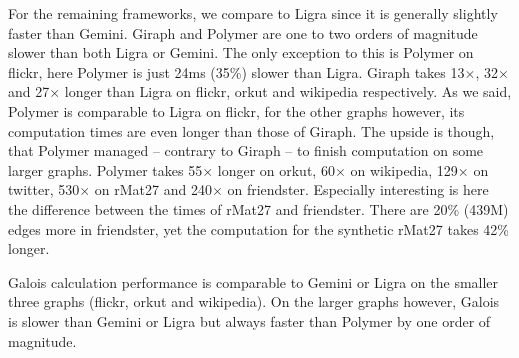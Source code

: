 For the remaining frameworks, we compare to Ligra since it is generally slightly faster than Gemini.
Giraph and Polymer are one to two orders of magnitude slower than both Ligra or Gemini. The only exception to this is Polymer on flickr, here Polymer is just 24ms (35\%) slower than Ligra.
Giraph takes 13$\times$, 32$\times$ and 27$\times$ longer than Ligra on flickr, orkut and wikipedia respectively.
As we said, Polymer is comparable to Ligra on flickr, for the other graphs however, its computation times are even longer than those of Giraph. The upside is though, that Polymer managed -- contrary to Giraph -- to finish computation on some larger graphs.
Polymer takes 55$\times$ longer on orkut, 60$\times$ on wikipedia, 129$\times$ on twitter, 530$\times$ on rMat27 and 240$\times$ on friendster. 
Especially interesting is here the difference between the times of rMat27 and friendster. There are 20\% (439M) edges more in friendster, yet the computation for the synthetic rMat27 takes 42\% longer.

Galois calculation performance is comparable to Gemini or Ligra on the smaller three graphs (flickr, orkut and wikipedia).
On the larger graphs however, Galois is slower than Gemini or Ligra but always faster than Polymer by one order of magnitude.





